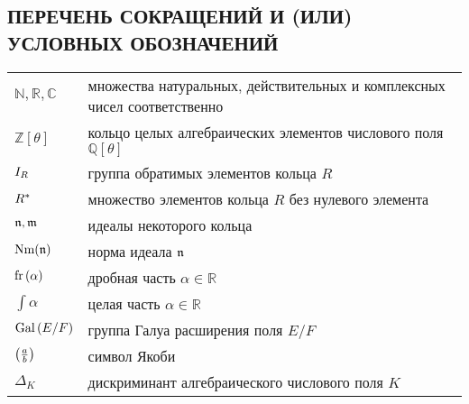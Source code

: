 \documentclass[_00_dissertation.tex]{subfiles}
\begin{document}
\onlyinsubfile{
    \renewcommand{\contentsname}{ОГЛАВЛЕНИЕ}
    \setcounter{tocdepth}{3}
    \tableofcontents
}

\begin{center}
    \chapter*{ПЕРЕЧЕНЬ СОКРАЩЕНИЙ И (ИЛИ) УСЛОВНЫХ ОБОЗНАЧЕНИЙ}
\end{center}

\begin{longtable}{p{}p{}}
    $\mathbb{N}, \mathbb{R}, \mathbb{C}$ & множества натуральных, действительных и
комплексных чисел соответственно\\

    $\mathbb{Z}[\theta]$ & кольцо целых алгебраических элементов числового поля $\mathbb{Q}[\theta]$\\

    $I_{R}$ & группа обратимых элементов кольца $R$\\

    $R^{*}$ & множество элементов кольца $R$ без нулевого элемента\\

    $\mathfrak{n}, \mathfrak{m}$ & идеалы некоторого кольца\\

    $\textrm{Nm}(\mathfrak{n})$ & норма идеала $\mathfrak{n}$\\

    $\textrm{fr}\left(\alpha\right)$ & дробная часть $\alpha \in \mathbb{R}$\\

    $\int{\alpha}$ & целая часть $\alpha \in \mathbb{R}$\\

    $\textrm{Gal}\left(E/F\right)$ & группа Галуа расширения поля $E/F$\\

    $\left(\frac{a}{b}\right)$ & символ Якоби\\

    $\Delta_{K}$ & дискриминант алгебраического числового поля $K$\\

\end{longtable}
\end{document}

